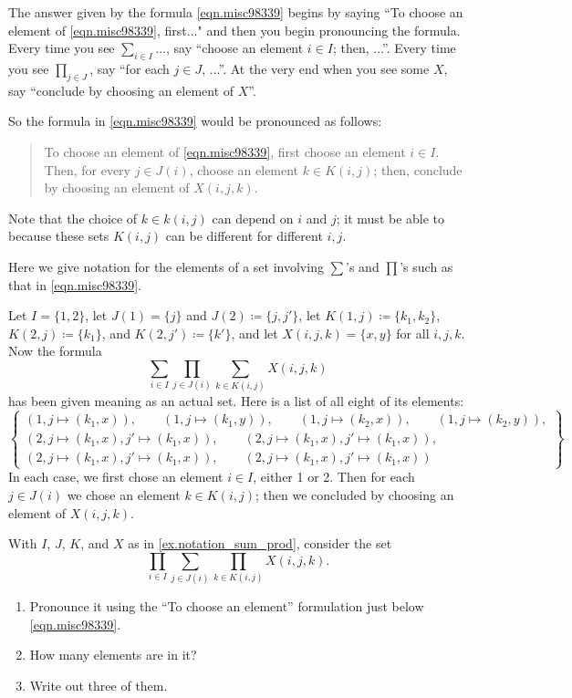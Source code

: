 \documentclass[DynamicalBook]{subfiles}
\begin{document}
The answer given by the formula \eqref{eqn.misc98339} begins by saying ``To choose an element of \eqref{eqn.misc98339}, first..." and then you begin pronouncing the formula. Every time you see $\sum_{i\in I}...$, say ``choose an element $i\in I$; then, ...''. Every time you see $\prod_{j\in J}$, say ``for each $j\in J$, ...''. At the very end when you see some $X$, say ``conclude by choosing an element of $X$''.

So the formula in \eqref{eqn.misc98339} would be pronounced as follows:
\begin{quote}
To choose an element of \eqref{eqn.misc98339}, first choose an element $i\in I$. Then, for every $j\in J(i)$, choose an element $k\in K(i,j)$; then, conclude by choosing an element of $X(i,j,k)$.
\end{quote}
Note that the choice of $k\in k(i,j)$ can depend on $i$ and $j$; it must be able to because these sets $K(i,j)$ can be different for different $i,j$.

\begin{example}\label{ex.notation_sum_prod}
Here we give notation for the elements of a set involving $\sum$'s and $\prod$'s such as that in \eqref{eqn.misc98339}.

Let $I=\{1,2\}$, let $J(1)=\{j\}$ and $J(2)\coloneqq\{j,j'\}$, let $K(1,j)\coloneqq\{k_1,k_2\}$, $K(2,j)\coloneqq\{k_1\}$, and $K(2,j')\coloneqq\{k'\}$, and let $X(i,j,k)=\{x,y\}$ for all $i,j,k$. Now the formula 
\[\sum_{i\in I}\prod_{j\in J(i)}\sum_{k\in K(i,j)}X(i,j,k)\]
 has been given meaning as an actual set. Here is a list of all eight of its elements:
\[
\left\{
\begin{gathered}
	(1, j\mapsto(k_1,x)),\qquad
	(1, j\mapsto(k_1,y)),\qquad
	(1, j\mapsto(k_2,x)),\qquad
	(1, j\mapsto(k_2,y)),\\
	(2, j\mapsto(k_1,x), j'\mapsto(k_1,x)),\qquad
	(2, j\mapsto(k_1,x), j'\mapsto(k_1,x)),\\
	(2, j\mapsto(k_1,x), j'\mapsto(k_1,x)),\qquad
	(2, j\mapsto(k_1,x), j'\mapsto(k_1,x))
\end{gathered}
\right\}
\]
In each case, we first chose an element $i\in I$, either 1 or 2. Then for each $j\in J(i)$ we chose an element $k\in K(i,j)$; then we concluded by choosing an element of $X(i,j,k)$.
\end{example}

\begin{exercise}
With $I$, $J$, $K$, and $X$ as in \cref{ex.notation_sum_prod}, consider the set
\[\prod_{i\in I}\sum_{j\in J(i)}\prod_{k\in K(i,j)}X(i,j,k).\]
\begin{enumerate}
	\item Pronounce it using the ``To choose an element'' formulation just below \eqref{eqn.misc98339}.
	\item How many elements are in it?
	\item Write out three of them.
\qedhere
\end{enumerate}
\end{exercise}
\end{document}
